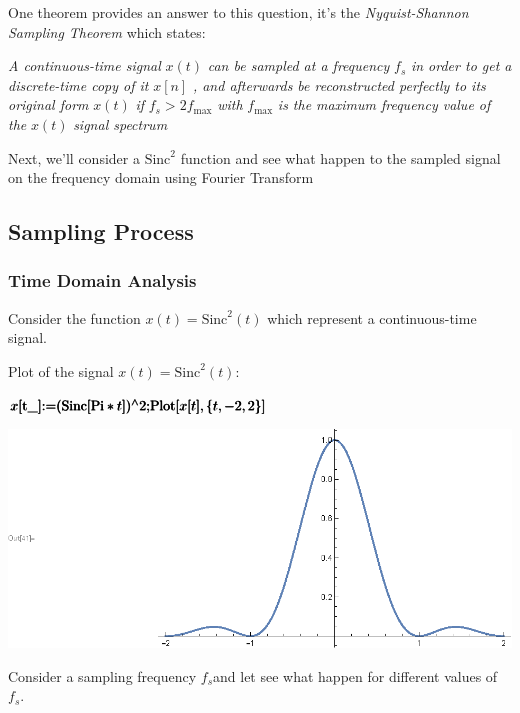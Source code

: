 \documentclass{report}
\begin{document}
One theorem provides an answer to this question, it{'}s the \textit{ Nyquist-Shannon Sampling Theorem} which states:

\textit{ A continuous-time signal }\textit{ \(x(t)\)}\textit{  can be sampled at a frequency }\textit{ \(f_s\)}\textit{  in order to get a discrete-time
copy of it }\textit{ \(x[n]\)}\textit{ , and afterwards be reconstructed perfectly to its original form }\textit{ \(x(t)\)}\textit{ if }\textit{
\(f_s>2f_{\max }\)}\textit{  with }\textit{ \(f_{\max }\)}\textit{  is the maximum frequency value of the }\textit{ \(x(t)\)}\textit{  signal spectrum}

Next, we{'}ll consider a \(\text{Sinc}^2\) function and see what happen to the sampled signal on the frequency domain using Fourier Transform

\subsection*{Sampling Process}

\subsubsection*{Time Domain Analysis}

Consider the function \(x(t)=\text{Sinc}^2(t)\) which represent a continuous-time signal.

Plot of the signal \(x(t)=\text{Sinc}^2(t)\):

\begin{doublespace}
\noindent\(\pmb{x[\text{t$\_$}]\text{:=}(\text{Sinc}[\text{Pi}*t]){}^{\wedge}2;}\\
\pmb{\text{Plot}[x[t],\{t,-2,2\}]}\)
\end{doublespace}

\includegraphics{GhassaneAniba_Signals_Systems_Oppenheim_Chap1_gr7.eps}

Consider a sampling frequency \(f_s\)and let see what happen for different values of \(f_s.\)
\end{document}
